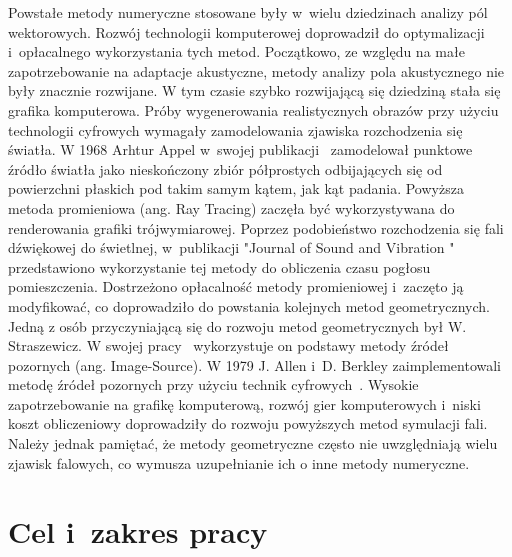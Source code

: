 Powstałe metody numeryczne stosowane były w~wielu dziedzinach analizy pól wektorowych. Rozwój technologii komputerowej doprowadził do optymalizacji i~opłacalnego wykorzystania tych metod. Początkowo, ze względu na małe zapotrzebowanie na adaptacje akustyczne, metody analizy pola akustycznego nie były znacznie rozwijane. W tym czasie szybko rozwijającą się dziedziną stała się grafika komputerowa. Próby wygenerowania realistycznych obrazów przy użyciu technologii cyfrowych wymagały zamodelowania zjawiska rozchodzenia się światła. W 1968 Arhtur Appel w~swojej publikacji~\cite{b3} zamodelował punktowe źródło światła jako nieskończony zbiór półprostych odbijających się od powierzchni płaskich pod takim samym kątem, jak kąt padania.  Powyższa  metoda promieniowa (ang. Ray Tracing) zaczęła być wykorzystywana do  renderowania grafiki trójwymiarowej. Poprzez podobieństwo rozchodzenia się fali dźwiękowej do świetlnej, w~publikacji "Journal of Sound and Vibration "~\cite{b4} przedstawiono wykorzystanie tej metody do obliczenia czasu pogłosu pomieszczenia. Dostrzeżono opłacalność metody promieniowej i~zaczęto ją modyfikować, co doprowadziło do powstania kolejnych metod geometrycznych. Jedną z osób przyczyniającą się do rozwoju metod geometrycznych był W. Straszewicz. W swojej pracy~\cite{b5} wykorzystuje on podstawy metody źródeł pozornych (ang. Image-Source). W 1979 J. Allen i~D. Berkley zaimplementowali  metodę źródeł pozornych przy użyciu technik cyfrowych~\cite{b6}. Wysokie zapotrzebowanie na grafikę komputerową, rozwój gier komputerowych i~niski koszt obliczeniowy doprowadziły do rozwoju powyższych metod symulacji fali. Należy jednak pamiętać, że metody geometryczne często nie uwzględniają wielu zjawisk falowych, co wymusza uzupełnianie ich o inne metody numeryczne.  



\section{Cel i~zakres pracy}\label{sec:celizakres}

